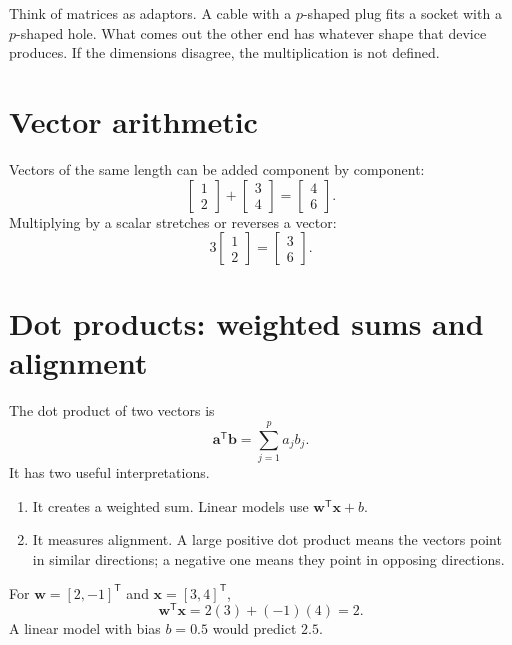 \begin{analogy}
Think of matrices as adaptors. A cable with a $p$-shaped plug fits a socket with a $p$-shaped hole. What comes out the other end has whatever shape that device produces. If the dimensions disagree, the multiplication is not defined.
\end{analogy}

\section{Vector arithmetic}

Vectors of the same length can be added component by component:
\[
\begin{bmatrix}1\\2\end{bmatrix}+
\begin{bmatrix}3\\4\end{bmatrix}=
\begin{bmatrix}4\\6\end{bmatrix}.
\]
Multiplying by a scalar stretches or reverses a vector:
\[
3\begin{bmatrix}1\\2\end{bmatrix}=
\begin{bmatrix}3\\6\end{bmatrix}.
\]

\section{Dot products: weighted sums and alignment}

The dot product of two vectors is
\[
  \bm{a}^{\mathsf T}\bm{b}=\sum_{j=1}^{p}a_jb_j.
\]
It has two useful interpretations.

\begin{enumerate}
  \item It creates a weighted sum. Linear models use $\bm{w}^{\mathsf T}\bm{x}+b$.
  \item It measures alignment. A large positive dot product means the vectors point in similar directions; a negative one means they point in opposing directions.
\end{enumerate}

\begin{workedexample}
For $\bm{w}=[2,-1]^{\mathsf T}$ and $\bm{x}=[3,4]^{\mathsf T}$,
\[
\bm{w}^{\mathsf T}\bm{x}=2(3)+(-1)(4)=2.
\]
A linear model with bias $b=0.5$ would predict $2.5$.
\end{workedexample}

